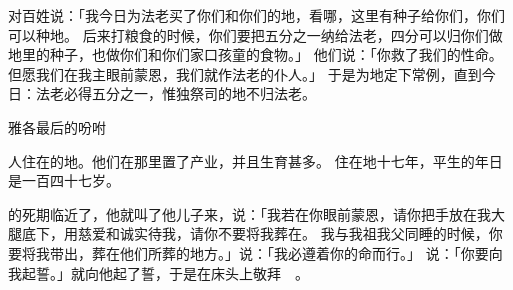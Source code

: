 {对百姓说：「我今日为法老买了你们和你们的地，看哪，这里有种子给你们，你们可以种地。
后来打粮食的时候，你们要把五分之一纳给法老，四分可以归你们做地里的种子，也做你们和你们家口孩童的食物。」
他们说：「你救了我们的性命。但愿我们在我主眼前蒙恩，我们就作法老的仆人。」
于是{}为{}地定下常例，直到今日：法老必得五分之一，惟独祭司的地不归法老。
\par }{\SH 雅各最后的吩咐
\par }{\PP {}人住在{}的{}地。他们在那里置了产业，并且生育甚多。
住在{}地十七年，{}平生的年日是一百四十七岁。
\par }{\PP {}的死期临近了，他就叫了他儿子{}来，说：「我若在你眼前蒙恩，请你把手放在我大腿底下，用慈爱和诚实待我，请你不要将我葬在{}。
我与我祖我父同睡的时候，你要将我带出{}，葬在他们所葬的地方。」{}说：「我必遵着你的命而行。」
说：「你要向我起誓。」{}就向他起了誓，于是{}在床头上敬拜　{}。

}

